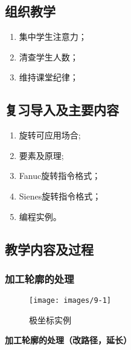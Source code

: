 \jxhj{%
	}

\makeshouye %

\subsection{组织教学}
\begin{enumerate}[\hspace{2em}1、]
	\item 集中学生注意力；
	\item 清查学生人数；
	\item 维持课堂纪律；
\end{enumerate}
\subsection{复习导入及主要内容}
\begin{enumerate}[1、]
	\item 旋转可应用场合;
	\item 要素及原理;
	\item Fanuc旋转指令格式；
	\item Sienes旋转指令格式；
	\item 编程实例。
\end{enumerate}



\subsection{教学内容及过程}

\subsubsection{加工轮廓的处理}
\begin{figure}[!hbtp]
	\centering	\texttt{[image: images/9-1]}
	\caption{极坐标实例} \label{极坐标实例}
\end{figure}
\textbf{加工轮廓的处理（改路径，延长）}
